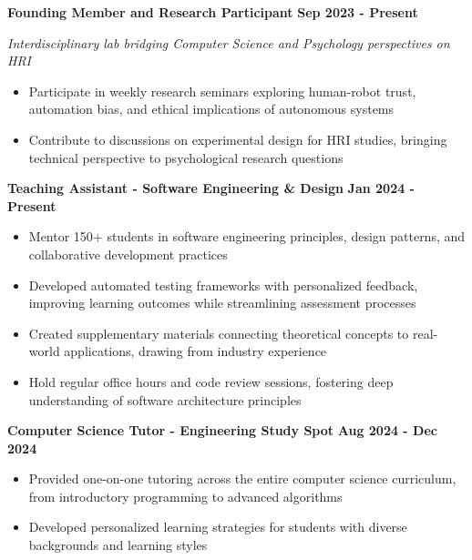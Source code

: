 \documentclass{article}
\begin{document}
 \hfill {}

\textbf{Founding Member and Research Participant} \hfill \textbf{Sep 2023 - Present}

\textit{Interdisciplinary lab bridging Computer Science and Psychology perspectives on HRI}
\begin{itemize}[noitemsep,topsep=2pt]
    \item Participate in weekly research seminars exploring human-robot trust, automation bias, and ethical implications of autonomous systems
    \item Contribute to discussions on experimental design for HRI studies, bringing technical perspective to psychological research questions
\end{itemize}


 \hfill {}

\textbf{Teaching Assistant - Software Engineering \& Design} \hfill \textbf{Jan 2024 - Present}
\begin{itemize}[noitemsep,topsep=2pt]
    \item Mentor 150+ students in software engineering principles, design patterns, and collaborative development practices
    \item Developed automated testing frameworks with personalized feedback, improving learning outcomes while streamlining assessment processes
    \item Created supplementary materials connecting theoretical concepts to real-world applications, drawing from industry experience
    \item Hold regular office hours and code review sessions, fostering deep understanding of software architecture principles
\end{itemize}

\textbf{Computer Science Tutor - Engineering Study Spot} \hfill \textbf{Aug 2024 - Dec 2024}
\begin{itemize}[noitemsep,topsep=2pt]
    \item Provided one-on-one tutoring across the entire computer science curriculum, from introductory programming to advanced algorithms
    \item Developed personalized learning strategies for students with diverse backgrounds and learning styles
\end{itemize}
\end{document}
